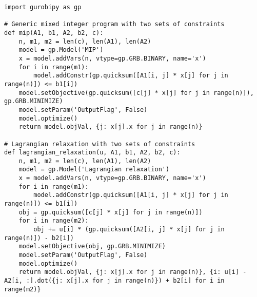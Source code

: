 \begin{verbatim}
import gurobipy as gp

# Generic mixed integer program with two sets of constraints
def mip(A1, b1, A2, b2, c):
    n, m1, m2 = len(c), len(A1), len(A2)
    model = gp.Model('MIP')
    x = model.addVars(n, vtype=gp.GRB.BINARY, name='x')
    for i in range(m1):
        model.addConstr(gp.quicksum([A1[i, j] * x[j] for j in range(n)]) <= b1[i])
    model.setObjective(gp.quicksum([c[j] * x[j] for j in range(n)]), gp.GRB.MINIMIZE)
    model.setParam('OutputFlag', False)
    model.optimize()
    return model.objVal, {j: x[j].x for j in range(n)}

# Lagrangian relaxation with two sets of constraints
def lagrangian_relaxation(u, A1, b1, A2, b2, c):
    n, m1, m2 = len(c), len(A1), len(A2)
    model = gp.Model('Lagrangian relaxation')
    x = model.addVars(n, vtype=gp.GRB.BINARY, name='x')
    for i in range(m1):
        model.addConstr(gp.quicksum([A1[i, j] * x[j] for j in range(n)]) <= b1[i])
    obj = gp.quicksum([c[j] * x[j] for j in range(n)])
    for i in range(m2):
        obj += u[i] * (gp.quicksum([A2[i, j] * x[j] for j in range(n)]) - b2[i])
    model.setObjective(obj, gp.GRB.MINIMIZE)
    model.setParam('OutputFlag', False)
    model.optimize()
    return model.objVal, {j: x[j].x for j in range(n)}, {i: u[i] - A2[i, :].dot({j: x[j].x for j in range(n)}) + b2[i] for i in range(m2)}


\end{verbatim}
